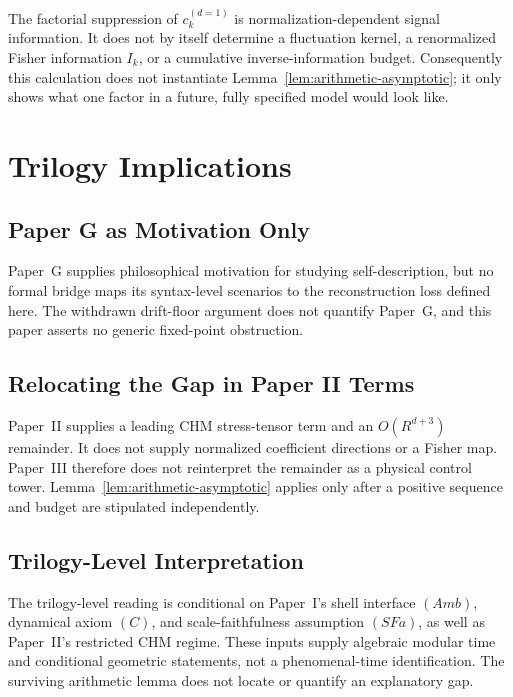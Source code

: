 \documentclass[12pt]{article}
\theoremstyle{definition}
\theoremstyle{remark}
\begin{document}
The factorial suppression of \(c_k^{(d=1)}\) is normalization-dependent
signal information. It does not by itself determine a fluctuation
kernel, a renormalized Fisher information \(I_k\), or a cumulative
inverse-information budget. Consequently this calculation does not
instantiate Lemma~\ref{lem:arithmetic-asymptotic}; it only shows what one
factor in a future, fully specified model would look like.

\section{Trilogy Implications}\label{sec:6}

\subsection{Paper G as Motivation Only}\label{subsec:6.1}

Paper~G\cite{PaperG} supplies philosophical motivation for studying
self-description, but no formal bridge maps its syntax-level scenarios
to the reconstruction loss defined here. The withdrawn drift-floor
argument does not quantify Paper~G, and this paper asserts no generic
fixed-point obstruction.

\subsection{Relocating the Gap in Paper II Terms}\label{subsec:6.2}

Paper~II\cite{PaperII} supplies a leading CHM stress-tensor term and an
\(O(R^{d+3})\) remainder. It does not supply normalized coefficient
directions or a Fisher map. Paper~III therefore does not reinterpret the
remainder as a physical control tower. Lemma~\ref{lem:arithmetic-asymptotic}
applies only after a positive sequence and budget are stipulated
independently.

\subsection{Trilogy-Level Interpretation}\label{subsec:6.3}

The trilogy-level reading is conditional on Paper~I's shell interface
\((Amb)\), dynamical axiom \((C)\), and scale-faithfulness assumption
\((SFa)\), as well as Paper~II's restricted CHM regime. These inputs
supply algebraic modular time and conditional geometric statements, not
a phenomenal-time identification. The surviving arithmetic lemma does
not locate or quantify an explanatory gap.
\end{document}

